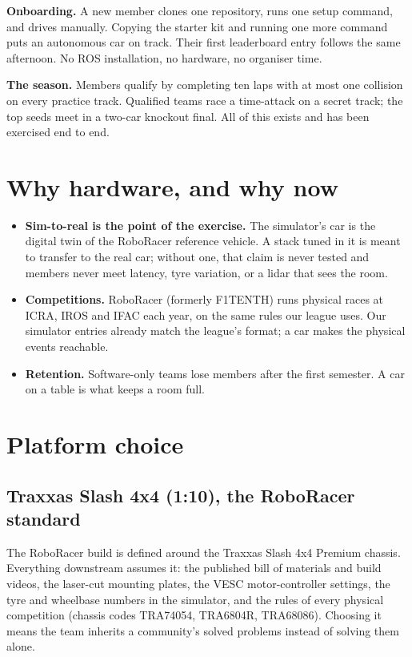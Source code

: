 \documentclass[11pt,a4paper]{article}
\begin{document}
\textbf{Onboarding.} A new member clones one repository, runs one setup command, and drives
manually. Copying the starter kit and running one more command puts an autonomous car on
track. Their first leaderboard entry follows the same afternoon. No ROS installation, no
hardware, no organiser time.

\textbf{The season.} Members qualify by completing ten laps with at most one collision on
every practice track. Qualified teams race a time-attack on a secret track; the top seeds meet
in a two-car knockout final. All of this exists and has been exercised end to end.

\section{Why hardware, and why now}

\begin{itemize}
  \item \textbf{Sim-to-real is the point of the exercise.} The simulator's car is the digital twin of the RoboRacer reference vehicle. A stack tuned in it is meant to transfer to the real car; without one, that claim is never tested and members never meet latency, tyre variation, or a lidar that sees the room.
  \item \textbf{Competitions.} RoboRacer (formerly F1TENTH) runs physical races at ICRA, IROS and IFAC each year, on the same rules our league uses. Our simulator entries already match the league's format; a car makes the physical events reachable.
  \item \textbf{Retention.} Software-only teams lose members after the first semester. A car on a table is what keeps a room full.
\end{itemize}

\section{Platform choice}

\subsection{Traxxas Slash 4x4 (1:10), the RoboRacer standard}

The RoboRacer build is defined around the Traxxas Slash 4x4 Premium chassis. Everything
downstream assumes it: the published bill of materials and build videos, the laser-cut
mounting plates, the VESC motor-controller settings, the tyre and wheelbase numbers in the
simulator, and the rules of every physical competition (chassis codes TRA74054, TRA6804R,
TRA68086). Choosing it means the team inherits a community's solved problems instead of
solving them alone.
\end{document}
